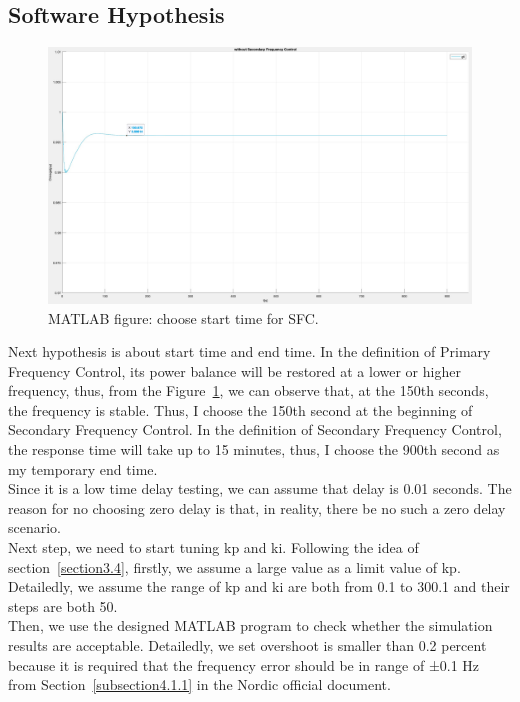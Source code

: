 \subsection{Software Hypothesis} %

\begin{figure}[htbp]
\centering
\includegraphics[width = .891\textwidth]{figure/4_1_1_without3.jpeg}
\caption{MATLAB figure: choose start time for SFC.}
\label{4_1_1_without3}
\end{figure}
Next hypothesis is about start time and end time. In the definition of Primary Frequency Control, its power balance will be restored at a lower or higher frequency, thus, from the Figure~\ref{4_1_1_without3}, we can observe that, at the 150th seconds, the frequency is stable. Thus, I choose the 150th second at the beginning of Secondary Frequency Control. In the definition of Secondary Frequency Control, the response time will take up to 15 minutes, thus, I choose the 900th second as my temporary end time.\\

Since it is a low time delay testing, we can assume that delay is 0.01 seconds. The reason for no choosing zero delay is that, in reality, there be no such a zero delay scenario.\\

Next step, we need to start tuning kp and ki. Following the idea of section~\ref{section3.4}, firstly, we assume a large value as a limit value of kp. Detailedly, we assume the range of kp and ki are both from 0.1 to 300.1 and their steps are both 50. \\

Then, we use the designed MATLAB program to check whether the simulation results are acceptable. Detailedly, we set overshoot is smaller than 0.2 percent because it is required that the frequency error should be in range of ±0.1 Hz from Section~\ref{subsection4.1.1} in the Nordic official document.\\

